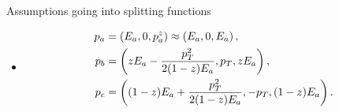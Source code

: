\begin{subappendices}
Assumptions going into splitting functions
\begin{itemize}
    \item
     \begin{subequations}
         \label{eq:split-momentum}
     \begin{align}
         p_a &= \left(E_a, 0, p^z_a\right)
         \approx \left(E_a, 0, E_a\right)
         ,
         \\
         p_b &= \left(zE_a - \frac{p_T^2}{2 (1-z) E_a}, p_T, z E_a\right)
         ,
         \\
         p_c &= \left((1-z)E_a + \frac{p_T^2}{2 (1-z) E_a}, -p_T, (1-z) E_a\right)
         .
     \end{align}
     \end{subequations}
\end{itemize}


\end{subappendices}

